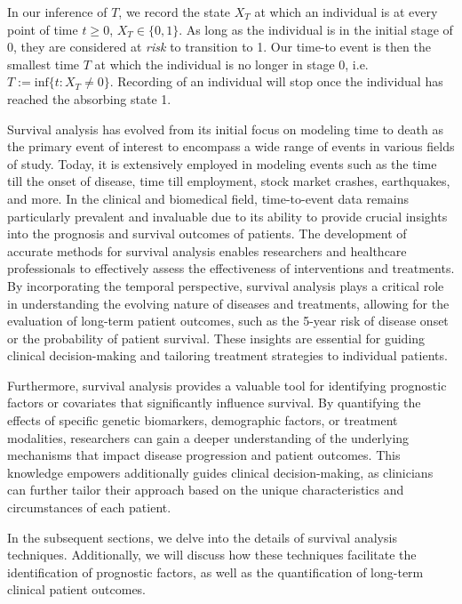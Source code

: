 In our inference of $T$, we record the state $X_{T}$ at which an individual is at every point of time $t \geq 0$, $X_T \in \{0, 1 \}$. As long as the individual is in the initial stage of 0, they are considered at \textit{risk} to transition to 1. Our time-to event is then the smallest time $T$ at which the individual is no longer in stage 0, i.e. $T := \textrm{inf}\{t : X_{T} \neq 0 \}$. Recording of an individual will stop once the individual has reached the absorbing state 1.
\bigskip \par
Survival analysis has evolved from its initial focus on modeling time to death as the primary event of interest to encompass a wide range of events in various fields of study. Today, it is extensively employed in modeling events such as the time till the onset of disease, time till employment, stock market crashes, earthquakes, and more. In the clinical and biomedical field, time-to-event data remains particularly prevalent and invaluable due to its ability to provide crucial insights into the prognosis and survival outcomes of patients. The development of accurate methods for survival analysis enables researchers and healthcare professionals to effectively assess the effectiveness of interventions and treatments. By incorporating the temporal perspective, survival analysis plays a critical role in understanding the evolving nature of diseases and treatments, allowing for the evaluation of long-term patient outcomes, such as the 5-year risk of disease onset or the probability of patient survival. These insights are essential for guiding clinical decision-making and tailoring treatment strategies to individual patients.
\bigskip \par
Furthermore, survival analysis provides a valuable tool for identifying prognostic factors or covariates that significantly influence survival. By quantifying the effects of specific genetic biomarkers, demographic factors, or treatment modalities, researchers can gain a deeper understanding of the underlying mechanisms that impact disease progression and patient outcomes. This knowledge empowers additionally guides clinical decision-making, as clinicians can further tailor their approach based on the unique characteristics and circumstances of each patient. 
\bigskip \par
In the subsequent sections, we  delve into the details of survival analysis techniques. Additionally, we will discuss how these techniques facilitate the identification of prognostic factors, as well as the quantification of long-term clinical patient outcomes. 

